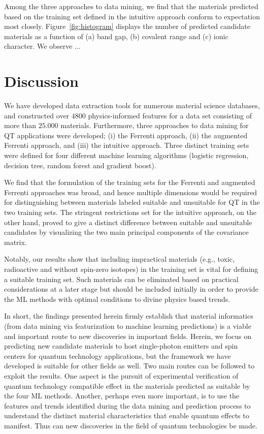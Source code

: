 \documentclass[superscriptaddress,unsortedaddress,
 amsmath,amssymb,
 aps,
]{revtex4-2}
\begin{document}
Among the three approaches to data mining, we find that the materials predicted based on the training set defined in the intuitive approach conform to expectation most closely. Figure~\ref{fig:histogram} displays the number of predicted candidate materials as a function of (a) band gap, (b) covalent range and (c) ionic character. We observe ... 
% 

\section*{Discussion} 
We have developed data extraction tools for numerous material science databases, and constructed over $4800$ physics-informed features for a data set consisting of more than $25.000$ materials. Furthermore, three approaches to data mining for QT applications were developed; (i) the Ferrenti approach,  (ii) the augmented Ferrenti approach, and (iii) the intuitive approach.  
Three distinct training sets were defined for four different machine learning algorithms (logistic regression, decision tree, random forest and gradient boost). 

We find that the formulation of the training sets for the Ferrenti and augmented Ferrenti approaches was broad, and hence multiple dimensions would be required for distinguishing between materials labeled suitable and unsuitable for QT in the two training sets. The stringent restrictions set for the intuitive approach, on the other hand, proved to give a distinct difference between suitable and unsuitable candidates by visualizing the two main principal components of the covariance matrix. 

Notably, our results show that including impractical materials (e.g., toxic, radioactive and without spin-zero isotopes) in the training set is vital for defining a suitable training set. 
Such materials can be eliminated based on practical considerations at a later stage but should be included initially in order to provide the ML methods with optimal conditions to divine physics based trends. 

In short, the findings presented herein firmly establish that material informatics (from data mining via featurization to machine learning predictions) is a viable and important route to new discoveries in important fields.  Herein, we focus on predicting new candidate materials to host single-photon emitters and spin centers for quantum technology applications, but the framework we have developed is suitable for other fields as well. 
Two main routes can be followed to exploit the results. One aspect is the pursuit of experimental verification of quantum technology compatible effect in the materials predicted as suitable by the four ML methods. Another, perhaps even more important, is to use the features and trends identified during the data mining and prediction process to understand the distinct material characteristics that enable quantum effects to manifest. Thus can new discoveries in the field of quantum technologies be made. 
\end{document}
